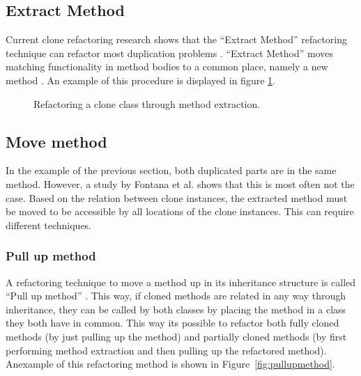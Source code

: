 \subsection{Extract Method}
Current clone refactoring research shows that the ``Extract Method'' refactoring technique can refactor most duplication problems \cite{fontana2015duplicated, tsantalis2015assessing, white2016deep}. ``Extract Method'' moves matching functionality in method bodies to a common place, namely a new method \cite{fowler2018refactoring}. An example of this procedure is displayed in figure \ref{fig:extractmethod}.

\begin{figure}[H]
\begin{parcolumns}{2}
\end{parcolumns}
\caption{Refactoring a clone class through method extraction.}
\label{fig:extractmethod}
\end{figure}

\subsection{Move method}
In the example of the previous section, both duplicated parts are in the same method. However, a study by Fontana et al. \cite{fontana2015duplicated} shows that this is most often not the case. Based on the relation between clone instances, the extracted method must be moved to be accessible by all locations of the clone instances. This can require different techniques.

\subsubsection{Pull up method}
A refactoring technique to move a method up in its inheritance structure is called ``Pull up method'' \cite{fowler2018refactoring}. This way, if cloned methods are related in any way through inheritance, they can be called by both classes by placing the method in a class they both have in common. This way its possible to refactor both fully cloned methods (by just pulling up the method) and partially cloned methods (by first performing method extraction and then pulling up the refactored method). Anexample of this refactoring method is shown in Figure~\ref{fig:pullupmethod}.

